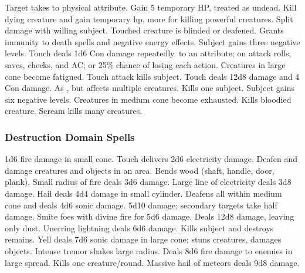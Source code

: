 \begin{spelllist}
   Target takes  to physical attribute.
   Gain 5 temporary HP, treated as undead.
   Kill dying creature and gain temporary hp, more for killing powerful creatures.
    Split damage with willing subject.
   Touched creature is blinded or deafened.
   Grants immunity to death spells and negative energy effects.
   Subject gains three negative levels.
   Touch deals 1d6 Con damage repeatedly.
    to an attribute;  on attack rolls, saves, checks, and AC; or 25\% chance of losing each action.
   Creatures in large cone become fatigued.
   Touch attack kills subject.
   Touch deals 12d8 damage and 4 Con damage.
   As , but affects multiple creatures.
   Kills one subject.
   Subject gains six negative levels.
   Creatures in medium cone become exhausted.
   Kills bloodied creature.
   Scream kills many creatures. 
\end{spelllist}

\subsubsection{Destruction Domain Spells}

\begin{spelllist}
   1d6 fire damage in small cone.
   Touch delivers 2d6 electricity damage.
   Deafen and damage creatures and objects in an area. 
   Bends wood (shaft, handle, door, plank).
   Small radius of fire deals 3d6 damage.
   Large line of electricity deals 3d8 damage.
   Hail deals 4d4 damage in small cylinder.
   Deafens all within medium cone and deals 4d6 sonic damage.
   5d10 damage; secondary targets take half damage.
   Smite foes with divine fire for 5d6 damage.
   Deals 12d8 damage, leaving only dust.
   Unerring lightning deals 6d6 damage.
  \F Kills subject and destroys remains.
   Yell deals 7d6 sonic damage in large cone; stuns creatures, damages objects.
   Intense tremor shakes large radius.
   Deals 8d6 fire damage to enemies in large spread.
   Kills one creature/round.
   Massive hail of meteors deals 9d8 damage.
\end{spelllist}

